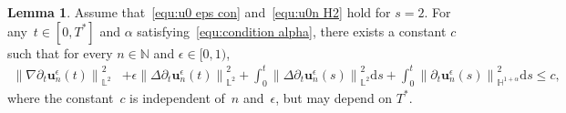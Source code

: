\documentclass[11pt,reqno]{amsart}
\theoremstyle{definition}
\newtheorem{lemma}[theorem]{Lemma}
\numberwithin{equation}{section}
\newcommand{\bff}{\boldsymbol}
\newcommand{\bb}{\mathbb}
\newcommand{\ds}{\mathrm{d}s}
\newcommand{\pa}{\partial}
\newcommand{\norm}[2]{\left\|{#1}\right\|_{#2}}
\begin{document}




\begin{lemma}\label{lem:ene est nab dt u}
	Assume that~\eqref{equ:u0 eps con} and~\eqref{equ:u0n H2} hold for $s=2$. For any~$t\in[0,T^\ast]$ and $\alpha$ satisfying~\eqref{equ:condition alpha}, there exists a constant $c$ such that for every $n\in\bb{N}$ and $\epsilon\in [0,1)$, 
	\begin{align*}
		\norm{\nabla \pa_t \bff{u}_n^\epsilon(t)}{\bb{L}^2}^2
		&+
		\epsilon \norm{\Delta \pa_t\bff{u}_n^\epsilon(t)}{\bb{L}^2}^2
		+
		\int_0^t
		\norm{\Delta \pa_t\bff{u}_n^\epsilon(s)}{\bb{L}^2}^2 \ds
		+
		\int_0^t
		\norm{\pa_t\bff{u}_n^\epsilon(s)}{\bb{H}^{1+\alpha}}^2 \ds
		\le c,
	\end{align*}
	where the constant~$c$ is independent of~$n$ and~$\epsilon$, but may depend on $T^\ast$.
\end{lemma}
\end{document}
